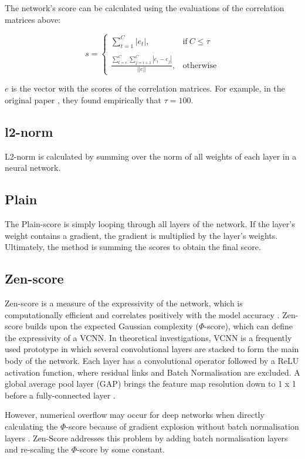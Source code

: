 The network's score can be calculated using the evaluations of the correlation matrices above: 

\begin{equation}
    s = 
    \begin{cases}
        \sum_{t=1}^C |e_t|, & \text{if}\ C \leq \tau \\ \\ 
        \frac{\sum_{t=e}^C \sum_{j=i+1}^C |e_i - e_j|}{||e||}, & \text{otherwise}
    \end{cases}
\end{equation}

$e$ is the vector with the scores of the correlation matrices. For example, in the original paper \autocite{lopes2021epe}, they found empirically that $\tau = 100$. 

\subsection{l2-norm}
L2-norm is calculated by summing over the norm of all weights of each layer in a neural network. 

\subsection{Plain}
The Plain-score is simply looping through all layers of the network. If the layer's weight contains a gradient, the gradient is multiplied by the layer's weights. Ultimately, the method is summing the scores to obtain the final score. 

\subsection{Zen-score}
Zen-score is a measure of the expressivity of the network, which is computationally efficient and correlates positively with the model accuracy \autocite{lin2021zen}. Zen-score builds upon the expected Gaussian complexity ($\Phi$-score), which can define the expressivity of a \Gls{VCNN}. In theoretical investigations, VCNN is a frequently used prototype in which several convolutional layers are stacked to form the main body of the network. Each layer has a convolutional operator followed by a ReLU activation function, where residual links and Batch Normalisation are excluded. A global average pool layer (GAP) brings the feature map resolution down to 1 x 1 before a fully-connected layer  \autocite{lin2021zen}.  

However, numerical overflow may occur for deep networks when directly calculating the $\Phi$-score because of gradient explosion without batch normalisation layers \autocite{lin2021zen}. Zen-Score addresses this problem by adding batch normalisation layers and re-scaling the $\Phi$-score by some constant. 

